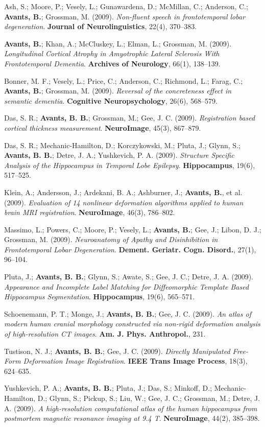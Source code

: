 \documentclass[10pt,letterpaper]{article}
\begin{document}
\begin{enumerate}
{  %
  \item Ash, S.; Moore, P.; Vesely, L.; Gunawardena, D.; McMillan, C.; Anderson, C.; \textbf{Avants, B.}; Grossman, M. (2009). \textit{Non-fluent speech in frontotemporal lobar degeneration}. \textbf{Journal of Neurolinguistics}, 22(4), 370--383.
  \item \textbf{Avants, B.}; Khan, A.; McCluskey, L.; Elman, L.; Grossman, M. (2009). \textit{Longitudinal Cortical Atrophy in Amyotrophic Lateral Sclerosis With Frontotemporal Dementia}. \textbf{Archives of Neurology}, 66(1), 138--139.
  \item Bonner, M. F.; Vesely, L.; Price, C.; Anderson, C.; Richmond, L.; Farag, C.; \textbf{Avants, B.}; Grossman, M. (2009). \textit{Reversal of the concreteness effect in semantic dementia}. \textbf{Cognitive Neuropsychology}, 26(6), 568--579.
  \item Das, S. R.; \textbf{Avants, B. B.}; Grossman, M.; Gee, J. C. (2009). \textit{Registration based cortical thickness measurement}. \textbf{NeuroImage}, 45(3), 867--879.
  \item Das, S. R.; Mechanic-Hamilton, D.; Korczykowski, M.; Pluta, J.; Glynn, S.; \textbf{Avants, B. B.}; Detre, J. A.; Yushkevich, P. A. (2009). \textit{Structure Specific Analysis of the Hippocampus in Temporal Lobe Epilepsy}. \textbf{Hippocampus}, 19(6), 517--525.
  \item Klein, A.; Andersson, J.; Ardekani, B. A.; Ashburner, J.; \textbf{Avants, B.}, et al. (2009). \textit{Evaluation of 14 nonlinear deformation algorithms applied to human brain MRI registration}. \textbf{NeuroImage}, 46(3), 786--802.
  \item Massimo, L.; Powers, C.; Moore, P.; Vesely, L.; \textbf{Avants, B.}; Gee, J.; Libon, D. J.; Grossman, M. (2009). \textit{Neuroanatomy of Apathy and Disinhibition in Frontotemporal Lobar Degeneration}. \textbf{Dement. Geriatr. Cogn. Disord.}, 27(1), 96--104.
  \item Pluta, J.; \textbf{Avants, B. B.}; Glynn, S.; Awate, S.; Gee, J. C.; Detre, J. A. (2009). \textit{Appearance and Incomplete Label Matching for Diffeomorphic Template Based Hippocampus Segmentation}. \textbf{Hippocampus}, 19(6), 565--571.
  \item Schoenemann, P. T.; Monge, J.; \textbf{Avants, B. B.}; Gee, J. C. (2009). \textit{An atlas of modern human cranial morphology constructed via non-rigid deformation analysis of high-resolution CT images}. \textbf{Am. J. Phys. Anthropol.}, 231.
  \item Tustison, N. J.; \textbf{Avants, B. B.}; Gee, J. C. (2009). \textit{Directly Manipulated Free-Form Deformation Image Registration}. \textbf{IEEE Trans Image Process}, 18(3), 624--635.
  \item Yushkevich, P. A.; \textbf{Avants, B. B.}; Pluta, J.; Das, S.; Minkoff, D.; Mechanic-Hamilton, D.; Glynn, S.; Pickup, S.; Liu, W.; Gee, J. C.; Grossman, M.; Detre, J. A. (2009). \textit{A high-resolution computational atlas of the human hippocampus from postmortem magnetic resonance imaging at 9.4 T}. \textbf{NeuroImage}, 44(2), 385--398.

}
\end{enumerate}
\end{document}
